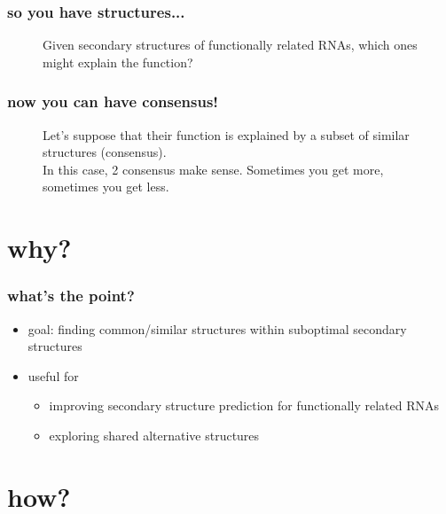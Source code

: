 \documentclass{beamer}
\begin{document}
\begin{frame}
	\frametitle{so you have structures...}
\begin{figure}[!htb]
\centering
\resizebox{0.5\textwidth}{!}{}
\caption{Given secondary structures of functionally related RNAs, which ones might explain the function?}
\end{figure} 
\end{frame}



\begin{frame}
	\frametitle{now you can have consensus!}
	\begin{figure}[!htb]
	\centering
	\resizebox{0.75\textwidth}{!}{}
	\caption{Let's suppose that their function is explained by a subset of similar structures (consensus). \\\hspace{\textwidth}In this case, 2 consensus make sense. Sometimes you get more, sometimes you get less.}
	\end{figure} 
\end{frame}



\section{why?}

\begin{frame}
	\frametitle{what's the point?}
\begin{figure}[!htb]
\centering
\resizebox{0.55\textwidth}{!}{}
\end{figure} 

	\begin{itemize}
		
		\item goal: finding common/similar structures within suboptimal secondary structures
		\item useful for
		\begin{itemize}
			\item improving secondary structure prediction for functionally related RNAs
			\item exploring shared alternative structures
		\end{itemize}
	\end{itemize}
	
\end{frame}


\section{how?}
\end{document}
